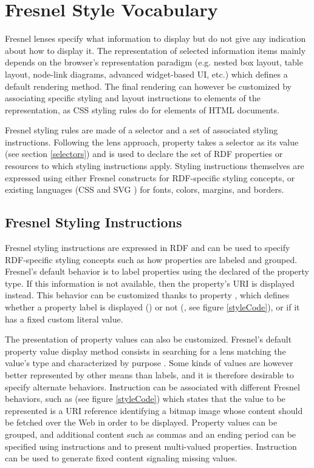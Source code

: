 \section{Fresnel Style Vocabulary}
\label{fsStyle}

Fresnel lenses specify what information to display but do not give any indication about how to display it. The representation of selected information items mainly depends on the browser's representation paradigm (e.g. nested box layout, table layout, node-link diagrams, advanced widget-based UI, etc.) which defines a default rendering method. The final rendering can however be customized by associating specific styling and layout instructions to elements of the representation, as CSS styling rules do for elements of HTML documents.

Fresnel styling rules are made of a selector and a set of associated styling instructions. Following the lens approach, property  takes a selector as its value (see section \ref{selectors}) and is used to declare the set of RDF properties or resources to which styling instructions apply. Styling instructions themselves are expressed using either Fresnel constructs for RDF-specific styling concepts, or existing languages (CSS \cite{CSS} and SVG \cite{SVG}) for fonts, colors, margins, and borders. 

\subsection{Fresnel Styling Instructions}

Fresnel styling instructions are expressed in RDF and can be used to specify RDF-specific styling concepts such as how properties are labeled and grouped. Fresnel's default behavior is to label properties using the declared  of the property type. If this information is not available, then the property's URI is displayed instead. This behavior can be customized thanks to property , which defines whether a property label is displayed () or not (, see figure \ref{styleCode}), or if it has a fixed custom literal value.

The presentation of property values can also be customized. Fresnel's default property value display method consists in searching for a lens matching the value's type and characterized by purpose . Some kinds of values are however better represented by other means than labels, and it is therefore desirable to specify alternate behaviors. Instruction  can be associated with different Fresnel behaviors, such as  (see figure \ref{styleCode}) which states that the value to be represented is a URI reference identifying a bitmap image  whose content should be fetched over the Web in order to be displayed. Property values can be grouped, and additional content such as commas and an ending period can be specified using instructions  and  to present multi-valued properties. Instruction  can be used to generate fixed content signaling missing values.

